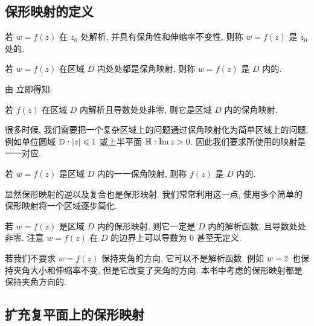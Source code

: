 \subsection{保形映射的定义}

\begin{definition}
  \begin{enuma}
    \item 若 $w=f(z)$ 在 $z_0$ 处解析, 并具有保角性和伸缩率不变性, 则称 $w=f(z)$ 是 $z_0$ 处的.
    \item 若 $w=f(z)$ 在区域 $D$ 内处处都是保角映射, 则称 $w=f(z)$ 是 $D$ 内的.
  \end{enuma}
\end{definition}

由 立即得知:
\begin{theorem}
  若 $f(z)$ 在区域 $D$ 内解析且导数处处非零, 则它是区域 $D$ 内的保角映射.
\end{theorem}

很多时候, 我们需要把一个复杂区域上的问题通过保角映射化为简单区域上的问题, 例如单位圆域 ${\mathbb{D}}:\left|z\right|\leqslant1$ 或上半平面 ${\mathbb{H}}:\operatorname{Im} z>0$.
因此我们要求所使用的映射是一一对应.

\begin{definition}
  若 $w=f(z)$ 是区域 $D$ 内的一一保角映射, 则称 $f(z)$ 是 $D$ 内的.\footnotemark
\end{definition}

显然保形映射的逆以及复合也是保形映射.
我们常常利用这一点, 使用多个简单的保形映射将一个区域逐步简化.

若 $w=f(z)$ 是区域 $D$ 内的保形映射, 则它一定是 $D$ 内的解析函数, 且导数处处非零.
注意 $w=f(z)$ 在 $D$ 的边界上可以导数为 $0$ 甚至无定义.

若我们不要求 $w=f(z)$ 保持夹角的方向, 它可以不是解析函数.
例如 $w=\overline z$ 也保持夹角大小和伸缩率不变, 但是它改变了夹角的方向.
  \alert{本书中考虑的保形映射都是保持夹角方向的.}


\subsection{扩充复平面上的保形映射}

